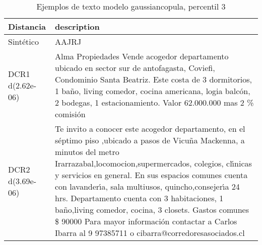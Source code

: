 \begin{table}[H]
\centering
\fontsize{10}{14}\selectfont
\caption{Ejemplos de texto modelo gaussiancopula, percentil 3}
\label{table-example-economicos-a-3-gaussiancopula-3p-text}
\begin{tabular}{|l|m{35em}|}
\hline
\rowcolor[gray]{0.8}
Distancia & description \\
\hline Sintético & AAJRJ \\
\hline DCR1 d(2.62e-06) & Alma Propiedades Vende acogedor departamento ubicado en sector sur de antofagasta, Coviefi, Condominio Santa Beatriz. Este costa de 3 dormitorios, 1 ba\~no, living comedor, cocina americana, logia balc\'on, 2 bodegas, 1 estacionamiento. Valor 62.000.000 mas 2 \% comisi\'on \\
\hline DCR2 d(3.69e-06) & Te invito a conocer este acogedor departamento, en el s\'eptimo piso ,ubicado a pasos de Vicu\~na Mackenna, a minutos del metro Irarrazabal,locomocion,supermercados, colegios, cl{\'\i}nicas y servicios en general.
 En sus espacios comunes cuenta con lavander{\'\i}a, sala multiusos, quincho,consejer{\'\i}a 24 hrs. Departamento cuenta con 3 habitaciones, 1 ba\~no,living comedor, cocina, 3 closets.
 Gastos comunes \$ 90000 Para mayor informaci\'on contactar a Carlos Ibarra al 9 97385711 o cibarra@corredoresasociados.cl \\
\hline
\end{tabular}
\end{table}
